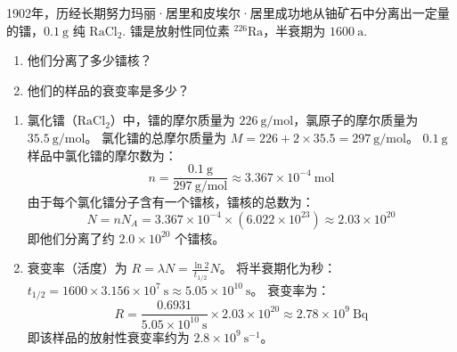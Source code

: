 \begin{exercise}\label{ex:29.16}
1902年，历经长期努力玛丽·居里和皮埃尔·居里成功地从铀矿石中分离出一定量的镭，$0.1 \ \mathrm{g}$ 纯 $\mathrm{RaCl_2}$. 镭是放射性同位素 $^{226}\mathrm{Ra}$，半衰期为 $1600 \ \mathrm{a}$. 
\begin{enumerate}
  \item[(a)] 他们分离了多少镭核？
  \item[(b)] 他们的样品的衰变率是多少？
\end{enumerate}
\end{exercise}
\begin{solution}
\begin{enumerate}
    \item[(a)] 氯化镭（$\mathrm{RaCl_2}$）中，镭的摩尔质量为 $226 \ \mathrm{g/mol}$，氯原子的摩尔质量为 $35.5 \ \mathrm{g/mol}$。
    氯化镭的总摩尔质量为 $M = 226 + 2 \times 35.5 = 297 \ \mathrm{g/mol}$。
    $0.1 \ \mathrm{g}$ 样品中氯化镭的摩尔数为：
    $$ n = \frac{0.1 \ \mathrm{g}}{297 \ \mathrm{g/mol}} \approx 3.367 \times 10^{-4} \ \mathrm{mol} $$
    由于每个氯化镭分子含有一个镭核，镭核的总数为：
    $$ N = n N_A = 3.367 \times 10^{-4} \times (6.022 \times 10^{23}) \approx 2.03 \times 10^{20} $$
    即他们分离了约 $2.0 \times 10^{20}$ 个镭核。

    \item[(b)] 衰变率（活度）为 $R = \lambda N = \frac{\ln 2}{t_{1/2}} N$。
    将半衰期化为秒：$t_{1/2} = 1600 \times 3.156 \times 10^7 \ \mathrm{s} \approx 5.05 \times 10^{10} \ \mathrm{s}$。
    衰变率为：
    $$ R = \frac{0.6931}{5.05 \times 10^{10} \ \mathrm{s}} \times 2.03 \times 10^{20} \approx 2.78 \times 10^9 \ \mathrm{Bq} $$
    即该样品的放射性衰变率约为 $2.8 \times 10^9 \ \mathrm{s^{-1}}$。
\end{enumerate}
\end{solution}

